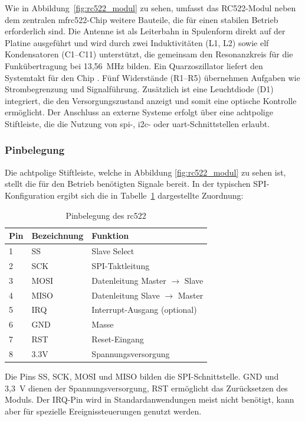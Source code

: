 Wie in Abbildung~\ref{fig:rc522_modul} zu sehen, umfasst das RC522-Modul neben dem zentralen \ac{mfrc522}-Chip weitere Bauteile, die für einen stabilen Betrieb erforderlich sind. 
Die Antenne ist als Leiterbahn in Spulenform direkt auf der Platine ausgeführt und wird durch zwei Induktivitäten (L1, L2) sowie elf Kondensatoren (C1--C11) unterstützt, die gemeinsam den Resonanzkreis für die Funkübertragung bei 13,56~MHz bilden. 
Ein Quarzoszillator liefert den Systemtakt für den Chip \cite{Handsontec:2023}. 
Fünf Widerstände (R1--R5) übernehmen Aufgaben wie Strombegrenzung und Signalführung. 
Zusätzlich ist eine Leuchtdiode (D1) integriert, die den Versorgungszustand anzeigt und somit eine optische Kontrolle ermöglicht. 
Der Anschluss an externe Systeme erfolgt über eine achtpolige Stiftleiste, die die Nutzung von \ac{spi}-, \ac{i2c}- oder \ac{uart}-Schnittstellen erlaubt.

\subsubsection{Pinbelegung}

Die achtpolige Stiftleiste, welche in Abbildung \ref{fig:rc522_modul} zu sehen ist, stellt die für den Betrieb benötigten Signale bereit. 
In der typischen SPI-Konfiguration ergibt sich die in Tabelle~\ref{tab:rc522_pinbelegung} dargestellte Zuordnung:

\begin{table}[H]
	\centering
	\caption{Pinbelegung des \ac{rc522} \cite{Handsontec:2023}}
	\label{tab:rc522_pinbelegung}
	\begin{tabular}{lll}
		\toprule
		\textbf{Pin} & \textbf{Bezeichnung} & \textbf{Funktion} \\
		\midrule
		1 & SS   & Slave Select \\
		2 & SCK  & SPI-Taktleitung \\
		3 & MOSI & Datenleitung Master $\rightarrow$ Slave \\
		4 & MISO & Datenleitung Slave $\rightarrow$ Master \\
		5 & IRQ  & Interrupt-Ausgang (optional) \\
		6 & GND  & Masse \\
		7 & RST  & Reset-Eingang \\
		8 & 3.3V & Spannungsversorgung \\
		\bottomrule
	\end{tabular}
\end{table}

Die Pins SS, SCK, MOSI und MISO bilden die SPI-Schnittstelle. 
GND und 3,3~V dienen der Spannungsversorgung, RST ermöglicht das Zurücksetzen des Moduls. 
Der IRQ-Pin wird in Standardanwendungen meist nicht benötigt, kann aber für spezielle Ereignissteuerungen genutzt werden.

